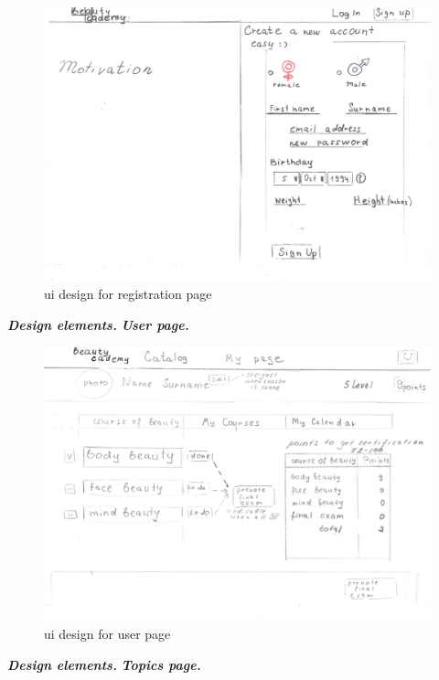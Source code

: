 \documentclass{scrartcl}
\begin{document}
\begin{figure}[H]
\centering
\includegraphics[width = 140mm]{proto-foto/ui-reg.JPG}
\caption{ui design for registration page}
\label{registration page}
\end{figure}

\textbf{\textit{Design elements.}}
\textbf{\textit{User page.}}

\begin{figure}[H]
\centering
\includegraphics[width = 140mm]{proto-foto/ui-user-page.JPG}
\caption{ui design for user page}
\label{user page}
\end{figure}

\textbf{\textit{Design elements.}}
\textbf{\textit{Topics page.}}
\end{document}
